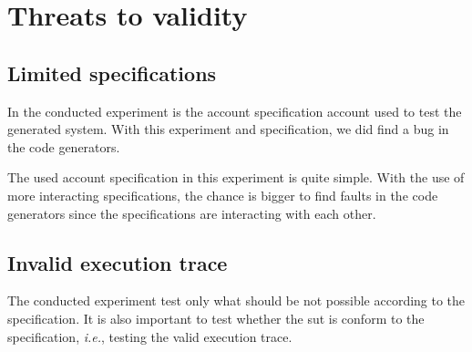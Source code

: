 


\section{Threats to validity}

\subsection*{Limited specifications}
In the conducted experiment is the account specification account used
to test the generated system. With this experiment and specification,
we did find a bug in the code generators.

The used account specification in this experiment is quite simple. With the use
of more interacting specifications, the chance is bigger to find faults in the code
generators since the specifications are interacting with each other.

\subsection*{Invalid execution trace}
The conducted experiment test only what should be not possible according to the
specification. It is also important to test whether the \gls{sut} is conform to the
specification, \textit{i.e.}, testing the valid execution trace.

